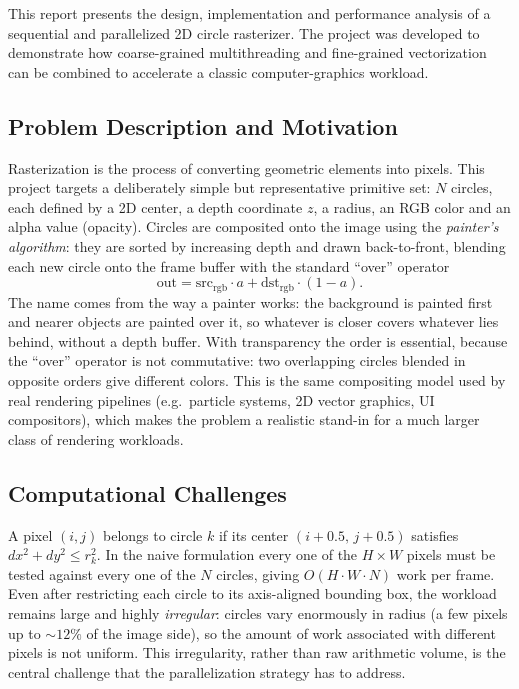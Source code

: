 \documentclass[10pt,twocolumn,letterpaper]{article}
\begin{document}
This report presents the design, implementation and performance analysis of a
sequential and parallelized 2D circle rasterizer. The project was developed to demonstrate how coarse-grained
multithreading and fine-grained vectorization can be combined to accelerate a
classic computer-graphics workload.

\subsection{Problem Description and Motivation}

Rasterization is the process of converting geometric elements into pixels.
This project targets a deliberately simple but representative primitive set:
$N$ circles, each defined by a 2D center, a depth coordinate $z$, a radius, an
RGB color and an alpha value (opacity). Circles are composited onto the image
using the \emph{painter's algorithm}: they are sorted by increasing depth and
drawn back-to-front, blending each new circle onto the frame buffer with the
standard ``over'' operator
\[
  \text{out} = \text{src}_{\text{rgb}}\cdot a + \text{dst}_{\text{rgb}} \cdot (1-a).
\]
The name comes from the way a painter works: the background is painted
first and nearer objects are painted over it, so whatever is closer covers
whatever lies behind, without a depth buffer. With transparency the order
is essential, because the ``over'' operator is not commutative: two
overlapping circles blended in opposite orders give different colors.
This is the same compositing model used by real rendering pipelines (e.g.\
particle systems, 2D vector graphics, UI compositors), which makes the problem
a realistic stand-in for a much larger class of rendering workloads.

\subsection{Computational Challenges}

A pixel $(i,j)$ belongs to circle $k$ if its center $(i+0.5,\,j+0.5)$ satisfies
$dx^2+dy^2 \le r_k^2$. In the naive formulation every one of the $H\times W$
pixels must be tested against every one of the $N$ circles, giving
$O(H\cdot W\cdot N)$ work per frame. Even after restricting each circle to its
axis-aligned bounding box, the workload remains large and highly
\emph{irregular}: circles vary enormously in radius (a few pixels up to
$\sim\!12\%$ of the image side), so the amount of work associated with
different pixels is not uniform. This irregularity, rather than raw arithmetic volume, is the
central challenge that the parallelization strategy has to address.
\end{document}
